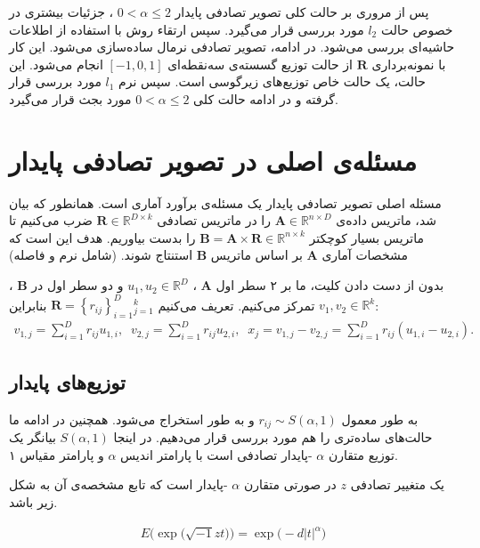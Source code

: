 پس از مروری بر حالت کلی تصویر تصادفی پایدار 
$0 < \alpha \leq 2$
، جزئیات بیشتری در خصوص حالت 
$l_2$
مورد بررسی قرار می‌گیرد. سپس ارتقاء روش با استفاده از اطلاعات حاشیه‌ای%
بررسی می‌شود. در ادامه، تصویر تصادفی نرمال ساده‌سازی می‌شود. این کار با نمونه‌برداری 
$\mathbf{R}$
از حالت توزیع گسسته‌ی سه‌نقطه‌ای 
$[ -1, 0, 1]$
انجام می‌شود. این حالت، یک حالت خاص توزیع‌های زیرگوسی%
است. سپس نرم 
$l_1$%
مورد بررسی قرار گرفته و در ادامه حالت کلی 
$0 < \alpha \leq 2$
مورد بجث قرار می‌گیرد.

\section{
مسئله‌ی اصلی در تصویر تصادفی پایدار
}
مسئله اصلی تصویر تصادفی پایدار یک مسئله‌ی برآورد آماری است. همانطور که بیان شد، ماتریس داده‌ی 
$\mathbf{A} \in \mathbb{R}^{n \times D}$
را در ماتریس تصادفی 
$\mathbf{R} \in \mathbb{R}^{D \times k}$
ضرب می‌کنیم تا ماتریس بسیار کوچکتر 
$\mathbf{B} = \mathbf{A} \times \mathbf{R} \in \mathbb{R}^{n \times k}$
را بدست بیاوریم. هدف این است که مشخصات آماری 
$\mathbf{A}$
بر اساس ماتریس 
$\mathbf{B}$
استنتاج شوند. (شامل نرم و فاصله)

بدون از دست دادن کلیت، ما بر ۲ سطر اول 
$\mathbf{A}$
، 
$u_1, u_2 \in \mathbb{R}^D$
و دو سطر اول در 
$\mathbf{B}$
،
$v_1, v_2 \in \mathbb{R}^k$
تمرکز می‌کنیم. تعریف می‌کنیم
$ \mathbf{R} = \left \{ r_{ij} \right \}_{i=1}^D {}_{j=1}^{k}$
بنابراین:
\begin{align}
v_{1,j} = \sum_{i=1}^{D} r_{ij}u_{1,i},\;\;
v_{2,j} = \sum_{i=1}^{D} r_{ij}u_{2,i},\;\;
x_j = v_{1,j} - v_{2,j} = \sum_{i=1}^D r_{ij}(u_{1,i} - u_{2,i}).
\label{eq:1hm}
\end{align}

\subsection{
توزیع‌های پایدار
}

به طور معمول 
$r_{ij} \sim S(\alpha, 1)$
 و به طور 
استخراج می‌شود. همچنین در ادامه ما حالت‌های ساده‌تری را هم مورد بررسی قرار می‌دهیم. در اینجا 
$S(\alpha, 1)$
بیانگر یک توزیع متقارن 
$\alpha$
-پایدار تصادفی است
\cite{litez171}
با پارامتر اندیس 
$\alpha$
و پارامتر مقیاس ۱.

یک متغییر تصادفی 
$z$
در صورتی متقارن  
$\alpha$
-پایدار است که تابع مشخصه‌ی آن به شکل زیر باشد.

\begin{align}
E \big( \exp  \big( \sqrt{-1}zt \big)  \big) = \exp \big( -d |t|^\alpha \big)
\label{eq:1hn}
\end{align}

